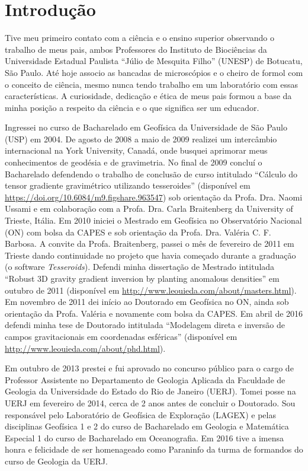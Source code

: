\section{Introdução}


Tive meu primeiro contato com a ciência e o ensino superior observando o
trabalho de meus pais, ambos Professores do Instituto de Biociências da
Universidade Estadual Paulista ``Júlio de Mesquita Filho'' (UNESP) de Botucatu,
São Paulo.
Até hoje associo as bancadas de microscópios e o cheiro de formol com o
conceito de ciência, mesmo nunca tendo trabalho em um laboratório com essas
características.
A curiosidade, dedicação e ética de meus pais formou a base da minha posição a
respeito da ciência e o que significa ser um educador.

Ingressei no curso de Bacharelado em Geofísica da Universidade de São
Paulo (USP) em 2004.
De agosto de 2008 a maio de 2009 realizei um intercâmbio internacional na York
University, Canadá, onde busquei aprimorar meus conhecimentos de geodésia e de
gravimetria.
No final de 2009 concluí o Bacharelado defendendo o trabalho de conclusão de
curso intitulado
``Cálculo do tensor gradiente gravimétrico utilizando tesseroides''
(disponível em \url{https://doi.org/10.6084/m9.figshare.963547})
sob orientação da Profa. Dra. Naomi Ussami e em colaboração com a
Profa. Dra. Carla Braitenberg da University of Trieste, Itália.
Em 2010 iniciei o Mestrado em Geofísica no Observatório Nacional (ON) com bolsa
da CAPES e sob orientação da Profa. Dra. Valéria C. F. Barbosa.
A convite da Profa. Braitenberg, passei o mês de fevereiro de 2011 em Trieste
dando continuidade no projeto que havia começado durante a graduação
(o software {\em Tesseroids}).
Defendi minha dissertação de Mestrado intitulada ``Robust 3D gravity gradient
inversion by planting anomalous densities'' em outubro de 2011 (disponível em
\url{http://www.leouieda.com/about/masters.html}).
Em novembro de 2011 dei início ao Doutorado em Geofísica no ON, ainda sob
orientação da Profa. Valéria e novamente com bolsa da CAPES.
Em abril de 2016 defendi minha tese de Doutorado intitulada ``Modelagem direta
e inversão de campos gravitacionais em coordenadas esféricas''
(disponível em \url{http://www.leouieda.com/about/phd.html}).

Em outubro de 2013 prestei e fui aprovado no concurso público para o cargo de
Professor Assistente no Departamento de Geologia Aplicada da Faculdade de
Geologia da Universidade do Estado do Rio de Janeiro (UERJ).
Tomei posse na UERJ em fevereiro de 2014, cerca de 2 anos antes de concluir o
Doutorado.
Sou responsável pelo Laboratório de Geofísica de Exploração (LAGEX) e pelas
disciplinas Geofísica 1 e 2 do curso de Bacharelado em Geologia e Matemática
Especial 1 do curso de Bacharelado em Oceanografia.
Em 2016 tive a imensa honra e felicidade de ser homenageado como Paraninfo da
turma de formandos do curso de Geologia da UERJ.

